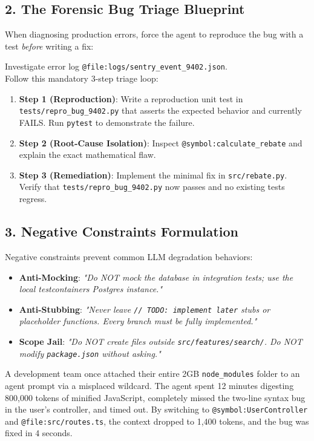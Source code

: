 \documentclass[11pt,a4paper,oneside]{book}
\begin{document}
\subsection{2. The Forensic Bug Triage Blueprint}
When diagnosing production errors, force the agent to reproduce the bug with a test \textit{before} writing a fix:

\begin{promptbox}
Investigate error log \texttt{@file:logs/sentry\_event\_9402.json}.\\
Follow this mandatory 3-step triage loop:
\begin{enumerate}
    \item \textbf{Step 1 (Reproduction)}: Write a reproduction unit test in \texttt{tests/repro\_bug\_9402.py} that asserts the expected behavior and currently FAILS. Run \texttt{pytest} to demonstrate the failure.
    \item \textbf{Step 2 (Root-Cause Isolation)}: Inspect \texttt{@symbol:calculate\_rebate} and explain the exact mathematical flaw.
    \item \textbf{Step 3 (Remediation)}: Implement the minimal fix in \texttt{src/rebate.py}. Verify that \texttt{tests/repro\_bug\_9402.py} now passes and no existing tests regress.
\end{enumerate}
\end{promptbox}

\subsection{3. Negative Constraints Formulation}
Negative constraints prevent common LLM degradation behaviors:
\begin{itemize}
    \item \textbf{Anti-Mocking}: \textit{"Do NOT mock the database in integration tests; use the local testcontainers Postgres instance."}
    \item \textbf{Anti-Stubbing}: \textit{"Never leave \texttt{// TODO: implement later} stubs or placeholder functions. Every branch must be fully implemented."}
    \item \textbf{Scope Jail}: \textit{"Do NOT create files outside \texttt{src/features/search/}. Do NOT modify \texttt{package.json} without asking."}
\end{itemize}

\begin{warstory}
A development team once attached their entire 2GB \texttt{node\_modules} folder to an agent prompt via a misplaced wildcard. The agent spent 12 minutes digesting 800,000 tokens of minified JavaScript, completely missed the two-line syntax bug in the user's controller, and timed out. By switching to \texttt{@symbol:UserController} and \texttt{@file:src/routes.ts}, the context dropped to 1,400 tokens, and the bug was fixed in 4 seconds.
\end{warstory}
\end{document}
